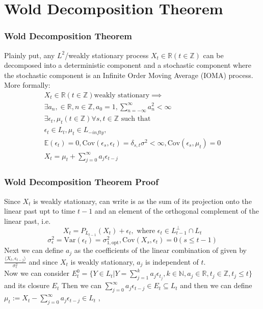 \documentclass{beamer}
\newcommand{\R}{\mathbb{R}}
\newcommand{\N}{\mathbb{N}}
\newcommand{\Z}{\mathbb{Z}}
\newcommand{\E}{\mathbb{E}}
\newcommand{\cov}{\text{Cov}}
\newcommand{\var}{\text{Var}}
\begin{document}
\section{Wold Decomposition Theorem}
\begin{frame}
    \frametitle{Wold Decomposition Theorem}
    \begin{theorem}
        Plainly put, any $L^2$/weakly stationary process $X_t \in \R (t \in \Z)$ can be decomposed into a deterministic component and a stochastic component where the stochastic component is an Infinite Order Moving Average (IOMA) process.\\
        More formally:
        \begin{align*}
            X_t \in \R(t \in \Z) \text{weakly stationary} \implies\\
            \exists a_n, \in \R, n \in \Z, a_0 = 1, \sum_{n=-\infty}^{\infty} a_n^2 < \infty \\
            \exists \epsilon_t, \mu_t (t \in \Z) \forall s,t \in \Z \text{ such that }\\
            \epsilon_t \in L_t, \mu_t \in L_{-infty},\\
            \E(\epsilon_t) = 0, \cov(\epsilon_s, \epsilon_t) = \delta_{s,t} \sigma^2 < \infty, \cov(\epsilon_s, \mu_t) = 0\\
            X_t = \mu_t + \sum_{j=0}^{\infty} a_j \epsilon_{t-j}
        \end{align*}
    \end{theorem}
\end{frame}

\begin{frame}
    \frametitle{Wold Decomposition Theorem Proof}
    Since $X_t$ is weakly stationary, can write is as the sum of its projection onto the linear past upt to time $t-1$ and an element of the orthogonal complement of the linear past, i.e.
    $$X_t = P_{L_{t-1}}(X_t) + \epsilon_t, \text{ where } \epsilon_t \in L_{t-1}^\perp \cap L_t$$ 
    $$\sigma^2_\epsilon = \var(\epsilon_t)  = \sigma^2_{1, \text{opt}}, \cov(X_s, \epsilon_t) = 0 (s \leq t -1)$$
    Next we can define $a_j$ as the coefficients of the linear combination of given by $\frac{\langle X_t, \epsilon_{t-j} \rangle}{\sigma^2_\epsilon}$ and since $X_t$ is weakly stationary, $a_j$ is independent of $t$.\\
    Now we can consider $E_t^0 = \{ Y \in L_t | Y = \sum_{j=1}^k a_j \epsilon_{t_{j}}, k \in \N, a_j \in \R, t_j \in \Z, t_j \leq t \}$ and its closure $E_t$ Then we can $\sum_{j=0}^{\infty} a_j \epsilon_{t-j} \in E_t \subseteq L_t$ and then we can define $\mu_t := X_t - \sum_{j=0}^{\infty} a_j \epsilon_{t-j} \in L_t$ ,  
\end{frame}
\end{document}
